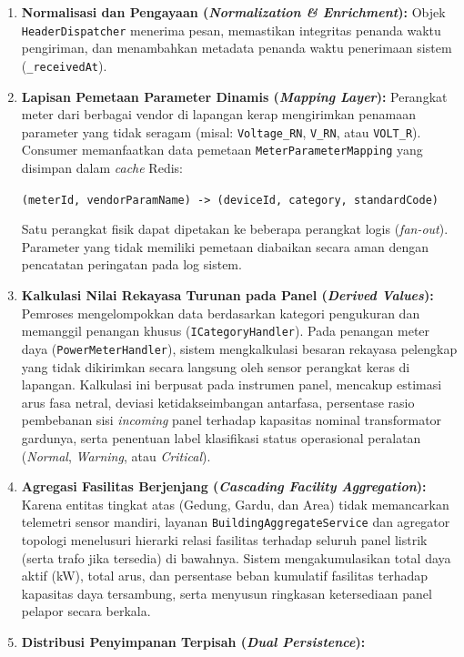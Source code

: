 \begin{enumerate}[label=\arabic*., leftmargin=*, itemsep=0pt]
  \item \textbf{Normalisasi dan Pengayaan (\textit{Normalization \& Enrichment}):} Objek \texttt{HeaderDispatcher} menerima pesan, memastikan integritas penanda waktu pengiriman, dan menambahkan metadata penanda waktu penerimaan sistem (\texttt{\_receivedAt}).
  \item \textbf{Lapisan Pemetaan Parameter Dinamis (\textit{Mapping Layer}):} Perangkat meter dari berbagai vendor di lapangan kerap mengirimkan penamaan parameter yang tidak seragam (misal: \texttt{Voltage\_RN}, \texttt{V\_RN}, atau \texttt{VOLT\_R}). Consumer memanfaatkan data pemetaan \texttt{MeterParameterMapping} yang disimpan dalam \textit{cache} Redis:
  \begin{center}
    \texttt{(meterId, vendorParamName) -> (deviceId, category, standardCode)}
  \end{center}
  Satu perangkat fisik dapat dipetakan ke beberapa perangkat logis (\textit{fan-out}). Parameter yang tidak memiliki pemetaan diabaikan secara aman dengan pencatatan peringatan pada log sistem.
  \item \textbf{Kalkulasi Nilai Rekayasa Turunan pada Panel (\textit{Derived Values}):} Pemroses mengelompokkan data berdasarkan kategori pengukuran dan memanggil penangan khusus (\texttt{ICategoryHandler}). Pada penangan meter daya (\texttt{PowerMeterHandler}), sistem mengkalkulasi besaran rekayasa pelengkap yang tidak dikirimkan secara langsung oleh sensor perangkat keras di lapangan. Kalkulasi ini berpusat pada instrumen panel, mencakup estimasi arus fasa netral, deviasi ketidakseimbangan antarfasa, persentase rasio pembebanan sisi \textit{incoming} panel terhadap kapasitas nominal transformator gardunya, serta penentuan label klasifikasi status operasional peralatan (\textit{Normal}, \textit{Warning}, atau \textit{Critical}).
  \item \textbf{Agregasi Fasilitas Berjenjang (\textit{Cascading Facility Aggregation}):} Karena entitas tingkat atas (Gedung, Gardu, dan Area) tidak memancarkan telemetri sensor mandiri, layanan \texttt{BuildingAggregateService} dan agregator topologi menelusuri hierarki relasi fasilitas terhadap seluruh panel listrik (serta trafo jika tersedia) di bawahnya. Sistem mengakumulasikan total daya aktif (kW), total arus, dan persentase beban kumulatif fasilitas terhadap kapasitas daya tersambung, serta menyusun ringkasan ketersediaan panel pelapor secara berkala.
  \item \textbf{Distribusi Penyimpanan Terpisah (\textit{Dual Persistence}):}

\end{enumerate}

